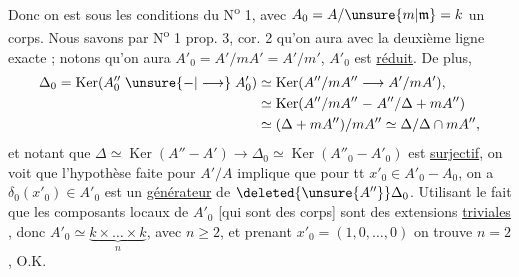 Donc on est sous les conditions du N\textsuperscript{o} 1, avec $A_0=A/\unsure{m|\mathfrak m}=k$ un corps.  Nous savons par N\textsuperscript{o} 1 prop. 3, cor. 2 qu'on aura
avec la deuxième ligne exacte ; notons qu'on aura $A'_0=A'/mA'=A'/m'$, $A'_0$ est \uline{réduit}. De plus,
\[
\begin{aligned}
\Delta_0=\operatorname{Ker}(A''_0\mathrel{\unsure{-|\longrightarrow}}A'_0)&\simeq\operatorname{Ker}(A''/mA''\longrightarrow A'/mA'),\\
&\simeq\operatorname{Ker}(A''/mA''\mathrel{-}A''/\Delta+mA'')\\
&\simeq(\Delta+mA'')/mA''\simeq\Delta/\Delta\cap mA'',
\end{aligned}
\]
et notant que $\Delta\simeq\operatorname{Ker}(A''\mathrel{-}A')\longrightarrow\Delta_0\simeq\operatorname{Ker}(A''_0\mathrel{-}A'_0)$ est \uline{surjectif}, on voit que  l'hypothèse faite pour $A'/A$ implique que pour tt $x'_0\in A'_0-A_0$, on a $\delta_0(x'_0)\in A'_0$ est un \uline{générateur} de $\deleted{\unsure{A''}}\Delta_0$. Utilisant le fait que les composants locaux de $A'_0$  [qui sont des corps] sont des extensions \uline{triviales} ,  donc $A'_0\simeq\underbrace{k\times\ldots\times k}_{n}$, avec $n\geq2$, et prenant $x'_0=(1,0,\ldots,0)$ on trouve $n=2$, O.K.
